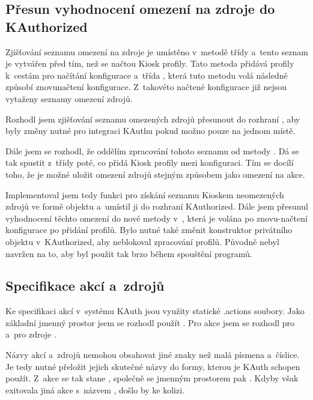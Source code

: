 \subsection*{Přesun vyhodnocení omezení na zdroje do KAuthorized}
Zjišťování seznamu omezení na zdroje je umístěno v~metodě  třídy  a~tento seznam je vytvářen před tím, než se načtou Kiosk profily. Tato metoda přidává profily k~cestám pro načítání konfigurace a~třída , která tuto metodu volá následně způsobí znovunačtení konfigurace. Z~takovéto načtené konfigurace již nejsou vytaženy seznamy omezení zdrojů.

Rozhodl jsem zjišťování seznamu omezených zdrojů přesunout do rozhraní , aby byly změny nutné pro integraci KAuthu pokud možno pouze na jednom místě.

Dále jsem se rozhodl, že oddělím zpracování tohoto seznamu od metody . Dá se tak spustit z~třídy  poté, co  přidá Kiosk profily mezi konfiguraci. Tím se docílí toho, že je možné uložit omezení zdrojů stejným způsobem jako omezení na akce.

Implementoval jsem tedy funkci  pro získání seznamu Kioskem neomezených zdrojů ve formě objektu  a~umístil ji do rozhraní KAuthorized. Dále jsem přesunul vyhodnocení těchto omezení do nové metody \linebreak{} v~, která je volána po znovu-načtení konfigurace po přidání profilů. Bylo nutné také změnit konstruktor privátního objektu v~KAuthorized, aby neblokoval zpracování profilů. Původně nebyl navržen na to, aby byl použit tak brzo během spouštění programů.

\subsection*{Specifikace akcí a~zdrojů}
Ke specifikaci akcí v~systému KAuth jsou využity statické .actions soubory. Jako základní jmenný prostor jsem se rozhodl použít . Pro akce jsem se rozhodl pro  a~pro zdroje .

Názvy akcí a~zdrojů nemohou obsahovat jiné znaky než malá písmena a~číslice. Je tedy nutné přeložit jejich skutečné názvy do formy, kterou je KAuth schopen použít. Z~akce  se tak stane , společně se jmenným prostorem pak \linebreak{}. Kdyby však exitovala jiná akce s~názvem , došlo by ke kolizi.

